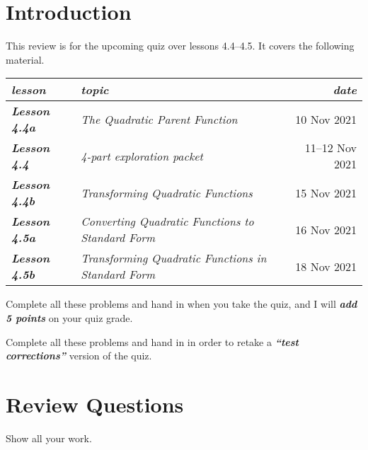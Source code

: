 \documentclass[12pt,letterpaper]{memoir}
\begin{document}
\pagestyle{plain}
\checkandfixthelayout
\raggedbottom

\forHONORS
{}

\section{Introduction}

This review is for the upcoming quiz over lessons 4.4--4.5. It covers the following material.
\begin{center}
    \begin{tabular}{llr}
        \toprule
        {\itshape lesson} & {\itshape topic} & {\itshape date} \\ 
        \midrule
        {\bfseries\itshape Lesson 4.4a} & {\itshape The Quadratic Parent Function} & 10 Nov 2021 \\
        {\bfseries\itshape Lesson 4.4}  & {\itshape 4-part exploration packet} & 11--12 Nov 2021 \\
        {\bfseries\itshape Lesson 4.4b} & {\itshape Transforming Quadratic Functions} & 15 Nov 2021 \\
        {\bfseries\itshape Lesson 4.5a} & {\itshape Converting Quadratic Functions to Standard Form} & 16 Nov 2021 \\
        {\bfseries\itshape Lesson 4.5b} & {\itshape Transforming Quadratic Functions in Standard Form} & 18 Nov 2021 \\
        \bottomrule
    \end{tabular}
\end{center}

\noindent 
\begin{tcbraster}[
    raster columns = 2,
    raster left skip = 0.25in, raster right skip = 0.25in, raster column skip = 0.25in,
    raster before skip = \baselineskip,
    raster after skip = \baselineskip,
    raster equal height,
]
    \begin{tcolorbox}
        Complete all these problems 
        and hand in when you take the quiz, 
        and I will {\bfseries\itshape add 5 points} on your quiz grade.
    \end{tcolorbox}
    \begin{tcolorbox}
        Complete all these problems 
        and hand in 
        in order to retake a 
        {\bfseries\itshape ``test corrections''} version of the quiz.
    \end{tcolorbox}
\end{tcbraster}

\section{Review Questions}

Show all your work.





\end{document}
